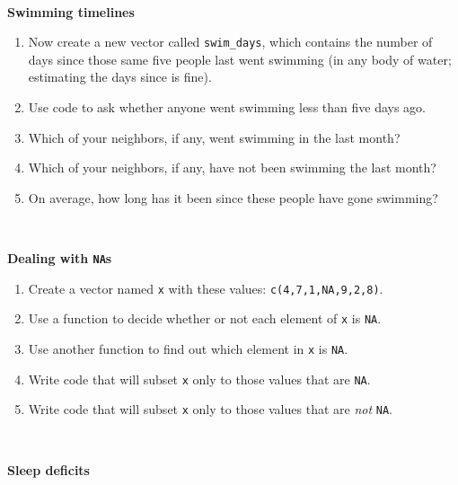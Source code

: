 \documentclass[
]{book}
\begin{document}
~

\textbf{Swimming timelines}

\begin{enumerate}
\def\labelenumi{\arabic{enumi}.}
\setcounter{enumi}{18}
\item
  Now create a new vector called \texttt{swim\_days}, which contains the number of days since those same five people last went swimming (in any body of water; estimating the days since is fine).
\item
  Use code to ask whether anyone went swimming less than five days ago.
\item
  Which of your neighbors, if any, went swimming in the last month?
\item
  Which of your neighbors, if any, have not been swimming the last month?
\item
  On average, how long has it been since these people have gone swimming?
\end{enumerate}

~

\textbf{Dealing with \texttt{NA}s}

\begin{enumerate}
\def\labelenumi{\arabic{enumi}.}
\setcounter{enumi}{23}
\item
  Create a vector named \texttt{x} with these values: \texttt{c(4,7,1,NA,9,2,8)}.
\item
  Use a function to decide whether or not each element of \texttt{x} is \texttt{NA}.
\item
  Use another function to find out which element in \texttt{x} is \texttt{NA}.
\item
  Write code that will subset \texttt{x} only to those values that are \texttt{NA}.
\item
  Write code that will subset \texttt{x} only to those values that are \emph{not} \texttt{NA}.
\end{enumerate}

~

\textbf{Sleep deficits}
\end{document}
